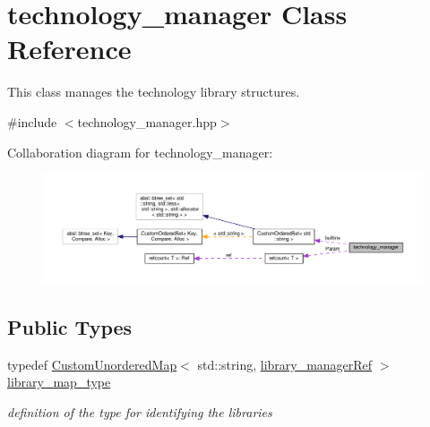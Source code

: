\hypertarget{classtechnology__manager}{}\section{technology\+\_\+manager Class Reference}
\label{classtechnology__manager}


This class manages the technology library structures.  




{\ttfamily \#include $<$technology\+\_\+manager.\+hpp$>$}



Collaboration diagram for technology\+\_\+manager\+:
\nopagebreak
\begin{figure}[H]
\begin{center}
\leavevmode
\includegraphics[width=350pt]{d2/d3d/classtechnology__manager__coll__graph}
\end{center}
\end{figure}
\subsection*{Public Types}
\begin{DoxyCompactItemize}
\item 
typedef \hyperlink{custom__map_8hpp_ad1ed68f2ff093683ab1a33522b144adc}{Custom\+Unordered\+Map}$<$ std\+::string, \hyperlink{library__manager_8hpp_aacc6d633b0aa80ecfeb1180fd480ae68}{library\+\_\+manager\+Ref} $>$ \hyperlink{classtechnology__manager_a97826ddbca97f92f63e34c5ef5948319}{library\+\_\+map\+\_\+type}
\begin{DoxyCompactList}\small\item\em definition of the type for identifying the libraries \end{DoxyCompactList}\end{DoxyCompactItemize}
